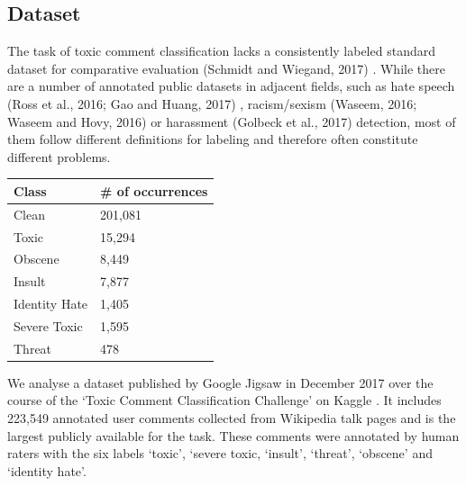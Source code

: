 \documentclass[10.5pt]{article}
\begin{document}
\vspace{0.3cm}
\begin{multicols*}{2}

\newpage
\section{Dataset}
The task of toxic comment classification lacks a  consistently labeled standard dataset for comparative evaluation (Schmidt and Wiegand, 2017) \cite{SchmidtandWiegand}.  While there are a number of annotated public datasets in adjacent fields, such as hate  speech (Ross et al., 2016; Gao and Huang,  2017) \cite{RossHuang}, racism/sexism (Waseem, 2016; Waseem  and Hovy, 2016) \cite{HateSpeechDetection} or harassment (Golbeck et al.,  2017) \cite{OnlineHarassmentResearch} detection, most of them follow different definitions for labeling and therefore often constitute  different problems.\\

\begin{center}
\centering %
\begin{tabularx}{0.4\textwidth}{YY} %
\hline\hline %
Class &  \# of occurrences \\ 
\hline %
Clean &  201,081 \\ %
Toxic & 15,294 \\
Obscene & 8,449 \\ %
Insult & 7,877 \\
Identity Hate & 1,405 \\ %
Severe Toxic & 1,595 \\
Threat & 478 \\ %
\hline %
\end{tabularx}
\label{tab_class}
\end{center}
\vspace{0.3cm}

We analyse a dataset published by Google Jigsaw  in December 2017 over the course of the ‘Toxic  Comment Classification Challenge’ on Kaggle \cite{datasetkaggle}. It  includes 223,549 annotated user comments collected from Wikipedia talk pages and is the largest  publicly available for the task. These comments  were annotated by human raters with the six labels  ‘toxic’, ‘severe toxic, ‘insult’, ‘threat’, ‘obscene’  and ‘identity hate’. 



\end{multicols*}
\end{document}
